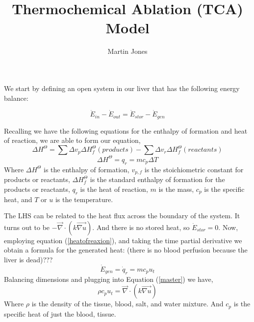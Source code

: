 \documentclass{article}
\begin{document}
\title{Thermochemical Ablation (TCA) Model}
\date{}
\author{Martin Jones}
\maketitle
\thispagestyle{empty}

We start by defining an open system in our liver that has the following energy balance:

\begin{equation}
\label{master}
\dot{E}_{in}-\dot{E}_{out}=\dot{E}_{stor}-\dot{E}_{gen}
\end{equation}

Recalling we have the following equations for the enthalpy of formation and heat of reaction, we are able to form our equation,
\begin{equation}
\Delta H^{\Theta}=\sum \Delta v_{p}\Delta H^{\Theta}_{f}(products)-\sum \Delta v_{r}\Delta H^{\Theta}_{f}(reactants)
\end{equation}
\begin{equation}
\label{heatofreaxion}
\Delta H^{\Theta}=q_{r}=mc_{p}\Delta T
\end{equation}
Where $\Delta H^{\Theta}$ is the enthalpy of formation, $v_{p,f}$ is the stoichiometric constant for products or reactants, $\Delta H^{\Theta}_{f}$ is the standard enthalpy of formation for the products or reactants, $q_{r}$ is the heat of reaction, $m$ is the mass, $c_p$ is the specific heat, and $T$ or $u$ is the temperature.  

The LHS can be related to the heat flux across the boundary of the system. It turns out to be $-\vec{\nabla}\cdot(k\vec{\nabla u})$. And there is no stored heat, so $\dot{E}_{stor}=0$. Now, employing equation (\ref{heatofreaxion}), and taking the time partial derivative we obtain a formula for the generated heat: (there is no blood perfusion because the liver is dead)???
\begin{equation}
\label{heatgen}
\dot{E}_{gen}=\dot{q}_{r}=mc_{p}u_{t}
\end{equation}
Balancing dimensions and plugging into Equation (\ref{master}) we have, 
\begin{equation}
\rho c_{p}u_{t}=\vec{\nabla}\cdot(k\vec{\nabla u})
\end{equation}
Where $\rho$ is the density of the tissue, blood, salt, and water mixture. And $c_{p}$ is the specific heat of just the blood, tissue.
\end{document}
